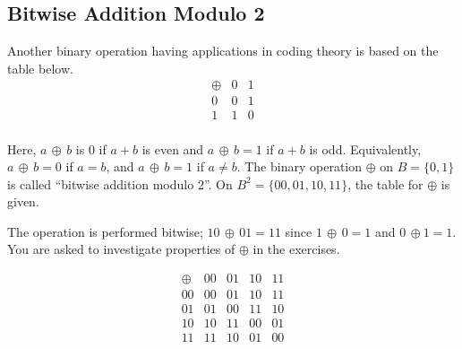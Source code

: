 \documentclass[12pt]{book}
\theoremstyle{definition}
\begin{document}
\subsection{Bitwise Addition Modulo 2}

Another binary operation having applications in coding theory is based on the table below.\\[.1in]
$$\begin{array}{c|cc}
\oplus & 0 & 1\\
\hline
0 & 0 & 1\\
1 & 1 & 0\\
\end{array}$$
\rule{0in}{.1in}
Here, $a\,\oplus\,b$ is 0 if $a+b$ is even and $a\,\oplus\,b=1$ if $a+b$ is odd.  Equivalently, $a\,\oplus\,b=0$ if $a=b$, and $a\,\oplus\,b=1$ if $a\neq b$.  The binary operation $\oplus$ on $B=\{0,1\}$ is called ``bitwise addition modulo 2''.  On $B^2=\{00,01,10,11\}$, the table for $\oplus$ is given. \\[.1in]
\begin{minipage}{3.5 in}
The operation is performed bitwise; $10\,\oplus\,01=11$ since $1\,\oplus\,0=1$ and $0\,\oplus 1 =1$.  You are asked to investigate properties of $\oplus$ in the exercises.
\end{minipage}
\begin{minipage}{3.5in}
$$\begin{array}{c|cccc}
\oplus& 00 & 01 & 10 & 11\\
\hline
00 & 00 & 01 & 10 & 11\\
01 & 01 & 00 & 11 & 10\\
10 & 10 & 11 & 00 & 01\\
11 & 11 & 10 & 01 & 00
\end{array}$$
\end{minipage}
\end{document}
